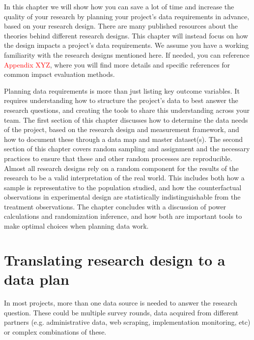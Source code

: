 
\begin{fullwidth}

In this chapter we will show how you can save a lot of time
and increase the quality of your research by planning your project's data requirements
in advance, based on your research design.
There are many published resources about 
the theories behind different research designs.
This chapter will instead focus on how the design 
impacts a project's data requirements.
We assume you have a working familiarity
with the research designs mentioned here.
If needed, you can reference \textcolor{red}{Appendix XYZ},
where you will find more details 
and specific references for common impact evaluation methods.

Planning data requirements is more than just listing key outcome variables. 
It requires understanding how to structure the project's data to best answer the research questions, 
and creating the tools to share this understanding across your team.
The first section of this chapter discusses how to determine the data needs of the project, 
based on the research design and measurement framework, 
and how to document these through a data map and master dataset(s).
The second section of this chapter covers random sampling and assignment
and the necessary practices to ensure that 
these and other random processes are reproducible.
Almost all research designs rely on a random component 
for the results of the research to be a valid interpretation of the real world.
This includes both how a sample is representative to the population studied,
and how the counterfactual observations in experimental design are statistically indistinguishable
from the treatment observations.
The chapter concludes with a discussion of power calculations and randomization inference,
and how both are important tools to make optimal choices when planning data work.


\end{fullwidth}


\section{Translating research design to a data plan}

In most projects, more than one data source is needed to answer the research question.
These could be multiple survey rounds,
data acquired from different  partners (e.g. administrative data,
web scraping, implementation monitoring, etc)
or complex combinations of these.

